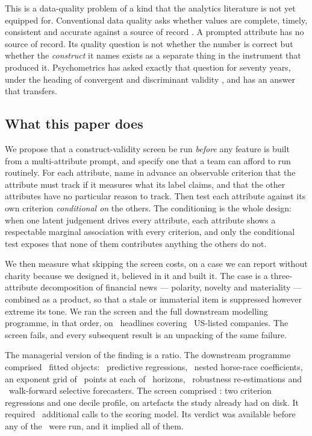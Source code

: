 \documentclass[preprint,12pt,authoryear]{elsarticle}
\theoremstyle{plain}
\theoremstyle{remark}
\begin{document}
This is a data-quality problem of a kind that the analytics literature is not
yet equipped for. Conventional data quality asks whether values are complete,
timely, consistent and accurate against a source of record
\citep{wang1996,batini2009}. A prompted attribute has no source of record. Its
quality question is not whether the number is correct but whether the
\emph{construct} it names exists as a separate thing in the instrument that
produced it. Psychometrics has asked exactly that question for seventy years,
under the heading of convergent and discriminant validity
\citep{campbell1959,cronbach1955}, and has an answer that transfers.

\subsection{What this paper does}

We propose that a construct-validity screen be run \emph{before} any feature is
built from a multi-attribute prompt, and specify one that a team can afford to
run routinely. For each attribute, name in advance an observable criterion that
the attribute must track if it measures what its label claims, and that the
other attributes have no particular reason to track. Then test each attribute
against its own criterion \emph{conditional on} the others. The conditioning is
the whole design: when one latent judgement drives every attribute, each
attribute shows a respectable marginal association with every criterion, and
only the conditional test exposes that none of them contributes anything the
others do not.

We then measure what skipping the screen costs, on a case we can report without
charity because we designed it, believed in it and built it. The case is a
three-attribute decomposition of financial news --- polarity, novelty and
materiality --- combined as a product, so that a stale or immaterial item is
suppressed however extreme its tone. We ran the screen and the full downstream
modelling programme, in that order, on \ScoredHeadlines\ headlines covering
\NCompanies\ US-listed companies. The screen fails, and every subsequent result
is an unpacking of the same failure.

The managerial version of the finding is a ratio. The downstream programme
comprised \DownstreamTotal\ fitted objects: \UnivariateFits\ predictive
regressions, \HorseRaceCoefs\ nested horse-race coefficients, an exponent grid
of \GridPerHorizon\ points at each of \GridHorizons\ horizons,
\RobustnessFits\ robustness re-estimations and \GateFits\ walk-forward selective
forecasters. The screen comprised \ScreenTotal: two criterion regressions and
one decile profile, on artefacts the study already had on disk. It required
\ScreenModelCalls\ additional calls to the scoring model. Its verdict was
available before any of the \DownstreamTotal\ were run, and it implied all of
them.
\end{document}
